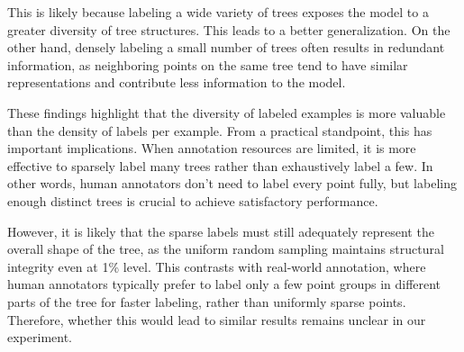 \documentclass[review,authoryear]{elsarticle}
\begin{document}
This is likely because labeling a wide variety of trees exposes the model to a greater diversity of tree structures. This leads to a better generalization. On the other hand, densely labeling a small number of trees often results in redundant information, as neighboring points on the same tree tend to have similar representations and contribute less information to the model. 


These findings highlight that the diversity of labeled examples is more valuable than the density of labels per example. From a practical standpoint, this has important implications. When annotation resources are limited, it is more effective to sparsely label many trees rather than exhaustively label a few. In other words, human annotators don't need to label every point fully, but labeling enough distinct trees is crucial to achieve satisfactory performance.

However, it is likely that the sparse labels must still adequately represent the overall shape of the tree, as the uniform random sampling maintains structural integrity even at 1\% level. This contrasts with real-world annotation, where human annotators typically prefer to label only a few point groups in different parts of the tree for faster labeling, rather than uniformly sparse points. Therefore, whether this would lead to similar results remains unclear in our experiment.  

\end{document}
